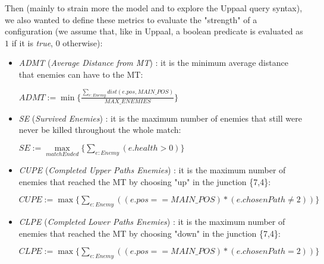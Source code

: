 \documentclass[
10pt, %
a4paper, %
oneside, %
headinclude,footinclude, %
BCOR5mm, %
]{scrartcl}
\begin{document}
			Then (mainly to strain more the model and to explore the Uppaal query syntax), we also wanted to define these metrics to evaluate the "strength" of a configuration (we assume that, like in Uppaal, a boolean predicate is evaluated as $1$ if it is \emph{true}, $0$ otherwise):
			\begin{itemize}
				\item \emph{ADMT} (\emph{Average Distance from MT}) : it is the minimum average distance that enemies can have to the MT:
				\begin{center}
					$ADMT:=\min\{\frac{\sum_{e:Enemy} dist(e.pos,MAIN\_POS)}{MAX\_ENEMIES}\}$
				\end{center}
				\item \emph{SE} (\emph{Survived Enemies}) : it is the maximum number of enemies that still were never be killed throughout the whole match:
				\begin{center}
					$SE:=\max\limits_{matchEnded}\{\sum_{e:Enemy} (e.health>0)\}$
				\end{center}
				\item \emph{CUPE} (\emph{Completed Upper Paths Enemies}) : it is the maximum number of enemies that reached the MT by choosing "up" in the junction \{7,4\}:
				\begin{center}
					$CUPE:=\max\{\sum_{e:Enemy} ((e.pos == MAIN\_POS)*(e.chosenPath\neq 2))\}$
				\end{center}
				\item \emph{CLPE} (\emph{Completed Lower Paths Enemies}) : it is the maximum number of enemies that reached the MT by choosing "down" in the junction \{7,4\}:
				\begin{center}
					$CLPE:=\max\{\sum_{e:Enemy} ((e.pos == MAIN\_POS)*(e.chosenPath=2))\}$
				\end{center}
			\end{itemize}
			
\end{document}
